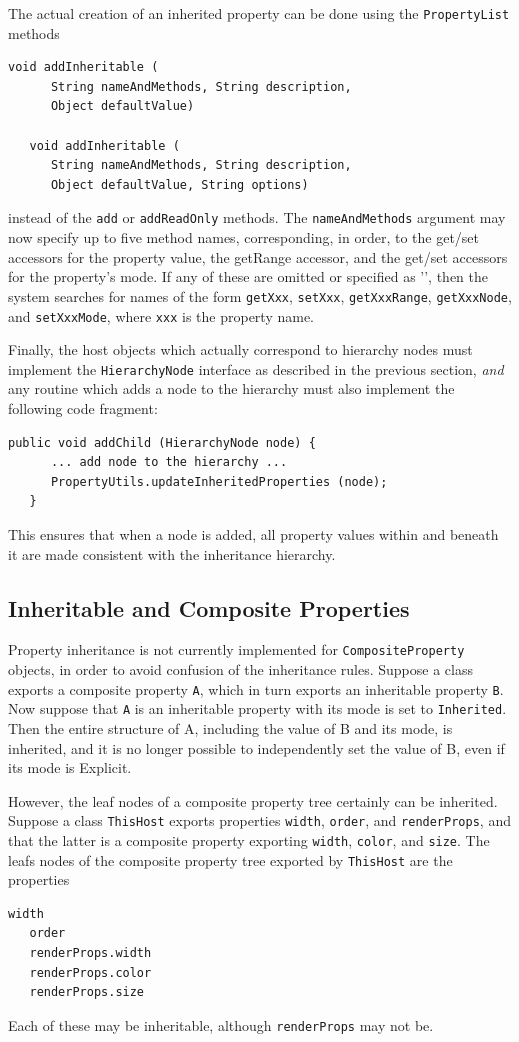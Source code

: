 \documentclass{article}
\begin{document}
The actual creation of an inherited property can be done using the
{\tt PropertyList} methods
\begin{lstlisting}[]
   void addInheritable (
      String nameAndMethods, String description, 
      Object defaultValue)
    
   void addInheritable (
      String nameAndMethods, String description, 
      Object defaultValue, String options)
\end{lstlisting}
instead of the {\tt add} or {\tt addReadOnly} methods. The {\tt nameAndMethods}
argument may now specify up to five method names, corresponding, in
order, to the get/set accessors for the property value, the getRange
accessor, and the get/set accessors for the property's mode.  If any
of these are omitted or specified as '{\tt *}', then the system
searches for names of the form
{\tt getXxx}, {\tt setXxx}, {\tt getXxxRange}, {\tt getXxxNode}, 
and {\tt setXxxMode}, where
{\tt xxx} is the property name.

Finally, the host objects which actually correspond to hierarchy nodes
must implement the {\tt HierarchyNode} interface as described in the
previous section, {\it and} any routine which adds a node to the
hierarchy must also implement the following code fragment:
\begin{lstlisting}[]
   public void addChild (HierarchyNode node) {
      ... add node to the hierarchy ...
      PropertyUtils.updateInheritedProperties (node);
   }      
\end{lstlisting}
This ensures that when a node is added, all property values within and
beneath it are made consistent with the inheritance hierarchy.

\subsection{Inheritable and Composite Properties}

Property inheritance is not currently implemented for 
{\tt CompositeProperty} objects, in order to avoid confusion of the
inheritance rules. Suppose a class exports a composite property 
{\tt A}, which in turn exports an inheritable property {\tt B}.  Now
suppose that {\tt A} is an inheritable property with its mode is set
to {\tt Inherited}. Then the entire structure of A, including the
value of B and its mode, is inherited, and it is no longer possible to
independently set the value of B, even if its mode is Explicit.

However, the leaf nodes of a composite property tree certainly can be
inherited. Suppose a class {\tt ThisHost} exports properties 
{\tt width}, {\tt order}, and {\tt renderProps}, and that the latter is a
composite property exporting {\tt width}, {\tt color}, and {\tt size}.
The leafs nodes of the composite property tree exported
by {\tt ThisHost} are the properties
\begin{lstlisting}[]
   width
   order
   renderProps.width
   renderProps.color
   renderProps.size
\end{lstlisting}
Each of these may be inheritable, although {\tt renderProps} may not be. 
\end{document}
